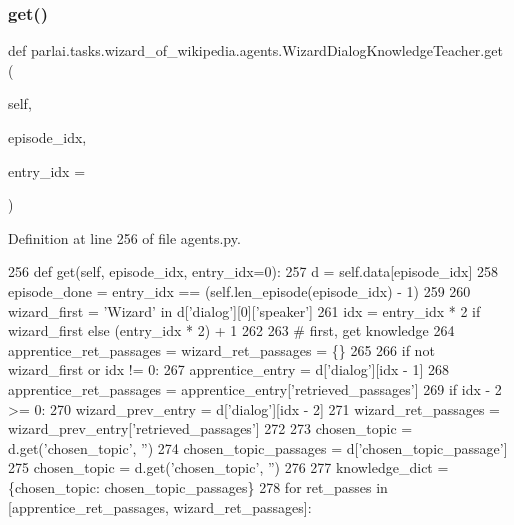 \subsubsection{\texorpdfstring{get()}{get()}}
{\footnotesize\ttfamily def parlai.\+tasks.\+wizard\+\_\+of\+\_\+wikipedia.\+agents.\+Wizard\+Dialog\+Knowledge\+Teacher.\+get (\begin{DoxyParamCaption}\item[{}]{self,  }\item[{}]{episode\+\_\+idx,  }\item[{}]{entry\+\_\+idx = {} }\end{DoxyParamCaption})}



Definition at line 256 of file agents.\+py.


\begin{DoxyCode}
256     \textcolor{keyword}{def }get(self, episode\_idx, entry\_idx=0):
257         d = self.data[episode\_idx]
258         episode\_done = entry\_idx == (self.len\_episode(episode\_idx) - 1)
259 
260         wizard\_first = \textcolor{stringliteral}{'Wizard'} \textcolor{keywordflow}{in} d[\textcolor{stringliteral}{'dialog'}][0][\textcolor{stringliteral}{'speaker'}]
261         idx = entry\_idx * 2 \textcolor{keywordflow}{if} wizard\_first \textcolor{keywordflow}{else} (entry\_idx * 2) + 1
262 
263         \textcolor{comment}{# first, get knowledge}
264         apprentice\_ret\_passages = wizard\_ret\_passages = \{\}
265 
266         \textcolor{keywordflow}{if} \textcolor{keywordflow}{not} wizard\_first \textcolor{keywordflow}{or} idx != 0:
267             apprentice\_entry = d[\textcolor{stringliteral}{'dialog'}][idx - 1]
268             apprentice\_ret\_passages = apprentice\_entry[\textcolor{stringliteral}{'retrieved\_passages'}]
269         \textcolor{keywordflow}{if} idx - 2 >= 0:
270             wizard\_prev\_entry = d[\textcolor{stringliteral}{'dialog'}][idx - 2]
271             wizard\_ret\_passages = wizard\_prev\_entry[\textcolor{stringliteral}{'retrieved\_passages'}]
272 
273         chosen\_topic = d.get(\textcolor{stringliteral}{'chosen\_topic'}, \textcolor{stringliteral}{''})
274         chosen\_topic\_passages = d[\textcolor{stringliteral}{'chosen\_topic\_passage'}]
275         chosen\_topic = d.get(\textcolor{stringliteral}{'chosen\_topic'}, \textcolor{stringliteral}{''})
276 
277         knowledge\_dict = \{chosen\_topic: chosen\_topic\_passages\}
278         \textcolor{keywordflow}{for} ret\_passes \textcolor{keywordflow}{in} [apprentice\_ret\_passages, wizard\_ret\_passages]:

\end{DoxyCode}

